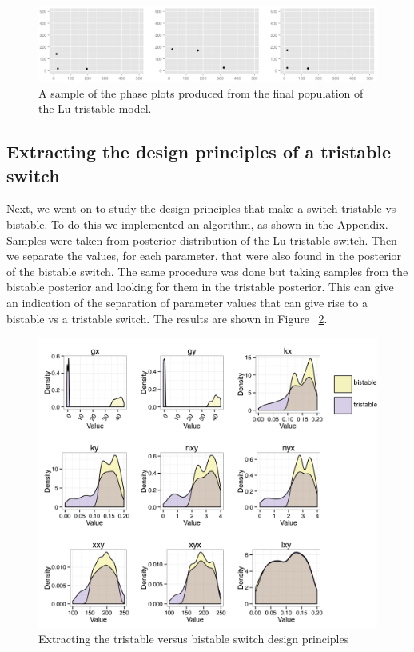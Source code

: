 \begin{figure}[h]
\centering
\includegraphics[scale=0.3]{chapterModelling/images/Lu/tri/phase_plots.png}
\caption{A sample of the phase plots produced from the final population of the Lu tristable model.}
\label{fig:lu_tri_phase_pl}
\end{figure}


\subsection{Extracting the design principles of a tristable switch}
Next, we went on to study the design principles that make a switch tristable vs bistable. To do this we implemented an algorithm, as shown in the Appendix. Samples were taken from posterior distribution of the Lu tristable switch. Then we separate the values, for each parameter, that were also found in the posterior of the bistable switch. The same procedure was done but taking samples from the bistable posterior and looking for them in the tristable posterior. This can give an indication of the separation of parameter values that can give rise to a bistable vs a tristable switch. The results are shown in Figure ~\ref{fig:des_princ}.

\begin{figure}[h]
\centering
\includegraphics[scale=0.7]{chapterModelling/images/design_principles/res_all_tri_biyp.png}
\caption{Extracting the tristable versus bistable switch design principles}
\label{fig:des_princ}
\end{figure}


